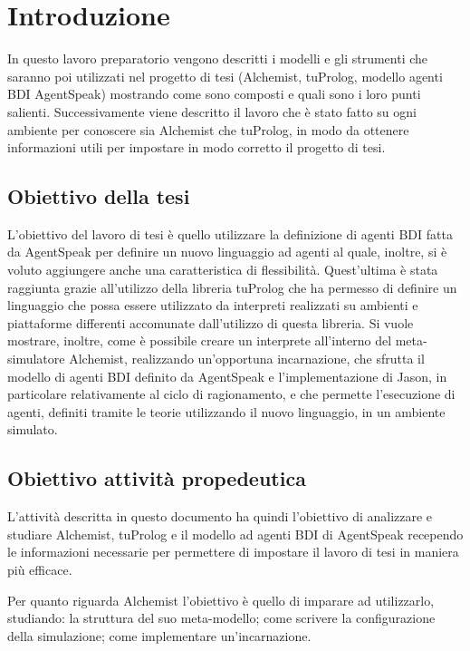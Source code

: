 \chapter{Introduzione}
\lhead[\fancyplain{}{\bfseries\thepage}]{\fancyplain{}{\bfseries\rightmark}}
In questo lavoro preparatorio vengono descritti i modelli e gli strumenti che saranno poi utilizzati nel progetto di tesi (Alchemist, tuProlog, modello agenti BDI AgentSpeak) mostrando come sono composti e quali sono i loro punti salienti. Successivamente viene descritto il lavoro che è stato fatto su ogni ambiente per conoscere sia Alchemist che tuProlog, in modo da ottenere informazioni utili per impostare in modo corretto il progetto di tesi.

\section{Obiettivo della tesi}
L'obiettivo del lavoro di tesi è quello utilizzare la definizione di agenti BDI fatta da AgentSpeak per definire un nuovo linguaggio ad agenti al quale, inoltre, si è voluto aggiungere anche una caratteristica di flessibilità. Quest'ultima è stata raggiunta grazie all'utilizzo della libreria tuProlog che ha permesso di definire un linguaggio che possa essere utilizzato da interpreti realizzati su ambienti e piattaforme differenti accomunate dall'utilizzo di questa libreria.
Si vuole mostrare, inoltre, come è possibile creare un interprete all'interno del meta-simulatore Alchemist, realizzando un'opportuna incarnazione, che sfrutta il modello di agenti BDI definito da AgentSpeak e l'implementazione di Jason, in particolare relativamente al ciclo di ragionamento, e che permette l'esecuzione di agenti, definiti tramite le teorie utilizzando il nuovo linguaggio, in un ambiente simulato.

\section{Obiettivo attività propedeutica}
L'attività descritta in questo documento ha quindi l'obiettivo di analizzare e studiare Alchemist, tuProlog e il modello ad agenti BDI di AgentSpeak recependo le informazioni necessarie per permettere di impostare il lavoro di tesi in maniera più efficace.

Per quanto riguarda Alchemist l'obiettivo è quello di imparare ad utilizzarlo, studiando: la struttura del suo meta-modello; come scrivere la configurazione della simulazione; come implementare un'incarnazione.

